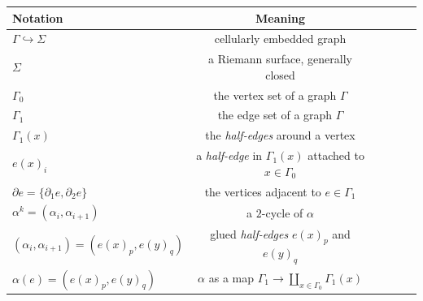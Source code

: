 \documentclass[11pt,oneside]{amsbook}
\numberwithin{equation}{section}
\theoremstyle{plain}
\theoremstyle{definition}
\theoremstyle{remark}
\begin{document}
	\begin{table} %
		\centering %
		\begin{tabular}{l c c c c c} %
			\midrule %
			Notation & Meaning  \\ %
			\midrule %
			$\Gamma \hookrightarrow \Sigma$ & cellularly embedded graph \\ %
			$\Sigma$ & a Riemann surface, generally closed \\ %
			$\Gamma_0$ & the vertex set of a graph $\Gamma$ \\ %
			$\Gamma_1$ & the edge set of a graph $\Gamma$ \\ %
			$\Gamma_1(x)$ & the \textit{half-edges} around a vertex \\ %
			$e(x)_i$ & a \textit{half-edge} in $\Gamma_1(x)$ attached to $x \in \Gamma_0$ \\ %
			$\partial e = \{\partial_1 e, \partial_2 e\}$ & the vertices adjacent to $e \in \Gamma_1$ \\ %
			$\alpha^k = (\alpha_i, \alpha_{i+1})$ & a $2$-cycle of $\alpha$ \\ %
			$(\alpha_i, \alpha_{i+1}) = (e(x)_p, e(y)_q)$ & glued \textit{half-edges} $e(x)_p$ and $e(y)_q$ \\ %
			$\alpha(e) = (e(x)_p, e(y)_q)$ & $\alpha$ as a map $\Gamma_1 \to \amalg_{x \in \Gamma_0}\Gamma_1(x)$ \\ %
			\midrule %

\end{tabular}
\end{table}
\end{document}
